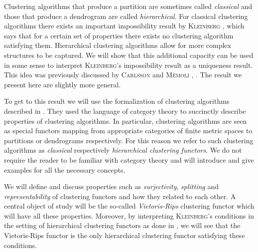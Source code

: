 Clustering algorithms that produce a partition are sometimes called \emph{classical} and those that produce a dendrogram are called \emph{hierarchical}.
For classical clustering algorithms there exists an important impossibility result by \textsc{Kleinberg} \cite{Kleinberg2002}, which says that for a certain set of properties there exists no clustering algorithm satisfying them.
Hierarchical clustering algorithms allow for more complex structures to be captured. We will show that this additional capacity can be used in some sense to interpret \textsc{Kleinberg}'s impossibility result as a uniqueness result. This idea was previously discussed by \textsc{Carlsson} and \textsc{M\'emoli} \cite{JMLR:v11:carlsson10a}, \cite{Carlsson2010}. The result we present here are slightly more general.

To get to this result we will use the formalization of clustering algorithms described in \cite{Carlsson2010}. They used the language of category theory to succinctly describe properties of clustering algorithms. In particular, clustering algorithms are seen as special functors mapping from appropriate categories of finite metric spaces to partitions or dendrograms respectively. For this reason we refer to such clustering algorithms as \emph{classical} respectively \emph{hierarchical clustering functors}. We do not require the reader to be familiar with category theory and will introduce and give examples for all the necessary concepts.

We will define and discuss properties such as \emph{surjectivity}, \emph{splitting} and \emph{representability} of clustering functors and how they related to each other. A central object of study will be the so-called \emph{Vietoris-Rips} clustering functor which will have all these properties. Moreover, by interpreting \textsc{Kleinberg}'s conditions in the setting of hierarchical clustering functors as done in \cite[Sec.~7.3.1]{Carlsson2010}, we will see that the Vietoris-Rips functor is the only hierarchical clustering functor satisfying these conditions.

